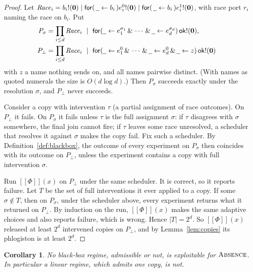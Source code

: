 \documentclass[11pt]{article}
\theoremstyle{definition}
\theoremstyle{plain}
\newtheorem{corollary}[definition]{Corollary}
\theoremstyle{remark}
\newcommand{\inp}[3]{\mathsf{for}(\,#1 \leftarrow #2\,)#3}
\newcommand{\out}[2]{#1!(#2)}
\newcommand{\enc}[1]{[\![#1]\!]}
\newcommand{\nil}{\mathbf{0}}
\newcommand{\wild}{\mathord{\underline{\hspace{0.5em}}}}
\newcommand{\ok}{\mathsf{ok}}
\newcommand{\ABS}{\textup{\textsc{Absence}}}
\begin{document}
\begin{proof}
Let $\mathit{Race}_i = \out{b_i}{\nil} \mid \inp{\wild}{b_i}{\out{e_i^0}{\nil}}
\mid \inp{\wild}{b_i}{\out{e_i^1}{\nil}}$, with race port $r_i$ naming the
race on $b_i$. Put
\[
\begin{aligned}
P_\sigma &= \prod_{i \le d} \mathit{Race}_i \ \mid\
  \mathsf{for}(\wild \leftarrow e_1^{\sigma_1} \,\&\, \cdots \,\&\,
  \wild \leftarrow e_d^{\sigma_d})\, \out{\ok}{\nil},\\
P_\bot &= \prod_{i \le d} \mathit{Race}_i \ \mid\
  \mathsf{for}(\wild \leftarrow e_1^0 \,\&\, \cdots \,\&\,
  \wild \leftarrow e_d^0 \,\&\, \wild \leftarrow z)\, \out{\ok}{\nil}
\end{aligned}
\]
with $z$ a name nothing sends on, and all names pairwise distinct. (With
names as quoted numerals the size is $O(d \log d)$.) Then $P_\sigma$
succeeds exactly under the resolution $\sigma$, and $P_\bot$ never
succeeds.

Consider a copy with intervention $\tau$ (a partial assignment of race
outcomes). On $P_\bot$ it fails. On $P_\sigma$ it fails unless $\tau$ is
the full assignment $\sigma$: if $\tau$ disagrees with $\sigma$ somewhere,
the final join cannot fire; if $\tau$ leaves some race unresolved, a
scheduler that resolves it against $\sigma$ makes the copy fail. Fix such
a scheduler. By Definition~\ref{def:blackbox}, the outcome of every
experiment on $P_\sigma$ then coincides with its outcome on $P_\bot$,
unless the experiment contains a copy with full intervention $\sigma$.

Run $\enc{\Phi}(x)$ on $P_\bot$ under the same scheduler. It is correct,
so it reports failure. Let $T$ be the set of full interventions it ever applied
to a copy. If some $\sigma \notin T$, then on $P_\sigma$, under the
scheduler above, every experiment returns what it returned on $P_\bot$.
By induction on the run, $\enc{\Phi}(x)$ makes the same adaptive choices
and also reports failure, which is wrong. Hence $|T| = 2^d$. So
$\enc{\Phi}(x)$ released at least $2^d$ intervened copies on $P_\bot$, and
by Lemma~\ref{lem:copies} its phlogiston is at least $2^d$.
\end{proof}

\begin{corollary}\label{cor:nobb}
No black-box regime, admissible or not, is exploitable for $\ABS$. In
particular a linear regime, which admits one copy, is not.
\end{corollary}
\end{document}
